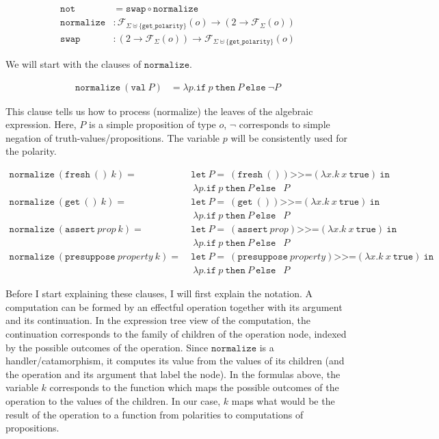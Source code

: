 \documentclass[a4paper,11pt,DIV=12]{scrartcl}
\newcommand{\dnot}{\mathop{\overline{\lnot}}}
\newcommand{\hsbind}{\mathbin{\texttt{>>=}}}
\newcommand{\ifte}[3]{\texttt{if}\ #1\ \texttt{then}\ #2\ \texttt{else}\ #3}
\begin{document}
\begin{align*}
\texttt{not} &= \texttt{swap} \circ \texttt{normalize} \\
\texttt{normalize} &: \mathcal{F}_{\Sigma \uplus \{\texttt{get\_polarity}\}}(o) \to
(2 \to \mathcal{F}_{\Sigma}(o)) \\
\texttt{swap} &: (2 \to \mathcal{F}_\Sigma(o)) \to \mathcal{F}_{\Sigma \uplus \{\texttt{get\_polarity}\}}(o)
\end{align*}

We will start with the clauses of $\texttt{normalize}$.

\begin{align*}
  \texttt{normalize}\ (\texttt{val}\ P) &= \lambda p. \ifte{p}{P}{\lnot P}
\end{align*}

This clause tells us how to process (normalize) the leaves of the algebraic
expression. Here, $P$ is a simple proposition of type $o$, $\lnot$
corresponds to simple negation of truth-values/propositions. The variable
$p$ will be consistently used for the polarity.

\begin{align*}
  \texttt{normalize}\ (\texttt{fresh}\ ()\ k) = \ &\texttt{let}\ P = \ (\texttt{fresh}\ ()) \hsbind (\lambda x. k\ x\ \texttt{true})\ \texttt{in} \\
    & \ \lambda p. \ifte{p}{P}{\dnot P} \\
  \texttt{normalize}\ (\texttt{get}\ ()\ k) = \ &\texttt{let}\ P = \ (\texttt{get}\ ()) \hsbind (\lambda x. k\ x\ \texttt{true})\ \texttt{in} \\
    & \ \lambda p. \ifte{p}{P}{\dnot P} \\
  \texttt{normalize}\ (\texttt{assert}\ prop\ k) = \ &\texttt{let}\ P = \ (\texttt{assert}\ prop) \hsbind (\lambda x. k\ x\ \texttt{true})\ \texttt{in} \\
    & \ \lambda p. \ifte{p}{P}{\dnot P} \\
  \texttt{normalize}\ (\texttt{presuppose}\ property\ k) = \ &\texttt{let}\ P = \ (\texttt{presuppose}\ property) \hsbind (\lambda x. k\ x\ \texttt{true})\ \texttt{in} \\
    & \ \lambda p. \ifte{p}{P}{\dnot P}
\end{align*}

Before I start explaining these clauses, I will first explain the
notation. A computation can be formed by an effectful operation together
with its argument and its continuation. In the expression tree view of the
computation, the continuation corresponds to the family of children of the
operation node, indexed by the possible outcomes of the operation. Since
$\texttt{normalize}$ is a handler/catamorphism, it computes its value from
the values of its children (and the operation and its argument that label
the node). In the formulas above, the variable $k$ corresponds to the
function which maps the possible outcomes of the operation to the values of
the children. In our case, $k$ maps what would be the result of the
operation to a function from polarities to computations of propositions.
\end{document}
